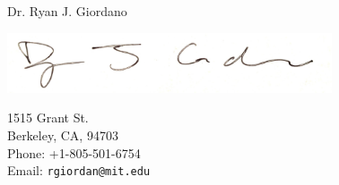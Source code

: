 \begin{minipage}[t]{0.7\textwidth}
\vspace{1em} Dr. Ryan J. Giordano

\hspace{-1em}\includegraphics[height=0.7in]{static_images/sig.jpg}
\end{minipage}
\begin{minipage}[t]{0.3\textwidth}
    \vspace{1em}
    1515 Grant St.\\
    Berkeley, CA, 94703\\
    Phone: +1-805-501-6754\\
    Email: \texttt{rgiordan@mit.edu}\\
\end{minipage}


